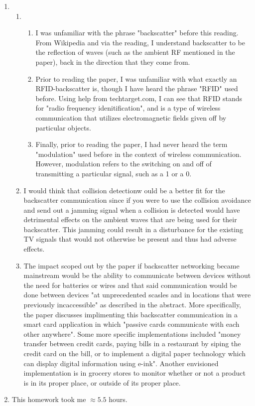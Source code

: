\documentclass[10pt]{article}
\begin{document}
\begin{enumerate}
\begin{enumerate}[label=(\alph*)]
    \end{enumerate}
    \item \begin{enumerate}[label=(\alph*)] 
        \item \begin{enumerate}
            \item I was unfamiliar with the phrase "backscatter" before this reading. From Wikipedia and via the reading, I understand backscatter to be the reflection of waves (such as the ambient RF mentioned in the paper), back in the direction that they come from.
            \item Prior to reading the paper, I was unfamiliar with what exactly an RFID-backscatter is, though I have heard the phrase "RFID" used before. Using help from techtarget.com, I can see that RFID stands for "radio frequency idenitification", and is a type of wireless communication that utilizes electromagnetic fields given off by particular objects.
            \item Finally, prior to reading the paper, I had never heard the term "modulation" used before in the context of wireless communication. However, modulation refers to the switching on and off of transmitting a particular signal, such as a 1 or a 0.  
        \end{enumerate}
        \item I would think that collision detectionw ould be a better fit for the backscatter communication since if you were to use the collision avoidance and send out a jamming signal when a collision is detected would have detrimental effects on the ambient waves that are being used for their backscatter. This jamming could result in a disturbance for the existing TV signals that would not otherwise be present and thus had adverse effects.
        \item The impact scoped out by the paper if backscatter networking became mainstream would be the ability to communicate between devices without the need for batteries or wires and that said communication would be done between devices "at unprecedented scasles and in locations that were previously incaccessible" as described in the abstract. More specifically, the paper discusses implimenting this backscatter communication in a smart card application in which "passive cards communicate with each other anywhere". Some more specific implementations included "money transfer between credit cards, paying bills in a restaurant by siping the credit card on the bill, or to implement a digital paper technology which can display digital information using e-ink". Another envisioned implementation is in grocery stores to monitor whether or not a product is in its proper place, or outside of its proper place.
    \end{enumerate}
    \item This homework took me $\approx 5.5$ hours.
\end{enumerate}
\end{document}
